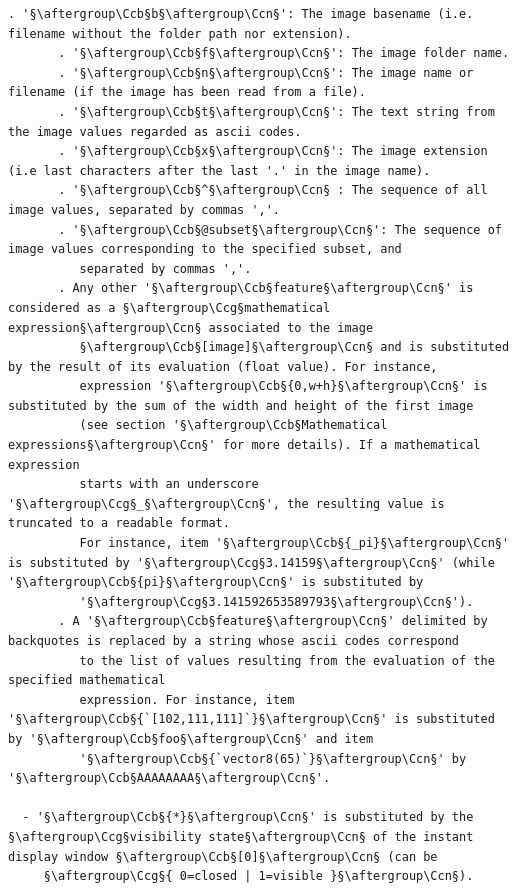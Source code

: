 \documentclass[a4paper,10.5pt,twoside]{book}
\def\Ccb{\color{cb}}
\def\Ccg{\color{cc}}
\def\Ccn{\color{black}}
\begin{document}
\begin{lstlisting}[escapechar=§]
       . '§\aftergroup\Ccb§b§\aftergroup\Ccn§': The image basename (i.e. filename without the folder path nor extension). 
       . '§\aftergroup\Ccb§f§\aftergroup\Ccn§': The image folder name. 
       . '§\aftergroup\Ccb§n§\aftergroup\Ccn§': The image name or filename (if the image has been read from a file). 
       . '§\aftergroup\Ccb§t§\aftergroup\Ccn§': The text string from the image values regarded as ascii codes. 
       . '§\aftergroup\Ccb§x§\aftergroup\Ccn§': The image extension (i.e last characters after the last '.' in the image name). 
       . '§\aftergroup\Ccb§^§\aftergroup\Ccn§ : The sequence of all image values, separated by commas ','. 
       . '§\aftergroup\Ccb§@subset§\aftergroup\Ccn§': The sequence of image values corresponding to the specified subset, and 
          separated by commas ','. 
       . Any other '§\aftergroup\Ccb§feature§\aftergroup\Ccn§' is considered as a §\aftergroup\Ccg§mathematical expression§\aftergroup\Ccn§ associated to the image 
          §\aftergroup\Ccb§[image]§\aftergroup\Ccn§ and is substituted by the result of its evaluation (float value). For instance, 
          expression '§\aftergroup\Ccb§{0,w+h}§\aftergroup\Ccn§' is substituted by the sum of the width and height of the first image 
          (see section '§\aftergroup\Ccb§Mathematical expressions§\aftergroup\Ccn§' for more details). If a mathematical expression 
          starts with an underscore '§\aftergroup\Ccg§_§\aftergroup\Ccn§', the resulting value is truncated to a readable format. 
          For instance, item '§\aftergroup\Ccb§{_pi}§\aftergroup\Ccn§' is substituted by '§\aftergroup\Ccg§3.14159§\aftergroup\Ccn§' (while '§\aftergroup\Ccb§{pi}§\aftergroup\Ccn§' is substituted by 
          '§\aftergroup\Ccg§3.141592653589793§\aftergroup\Ccn§'). 
       . A '§\aftergroup\Ccb§feature§\aftergroup\Ccn§' delimited by backquotes is replaced by a string whose ascii codes correspond 
          to the list of values resulting from the evaluation of the specified mathematical 
          expression. For instance, item '§\aftergroup\Ccb§{`[102,111,111]`}§\aftergroup\Ccn§' is substituted by '§\aftergroup\Ccb§foo§\aftergroup\Ccn§' and item 
          '§\aftergroup\Ccb§{`vector8(65)`}§\aftergroup\Ccn§' by '§\aftergroup\Ccb§AAAAAAAA§\aftergroup\Ccn§'. 
 
  - '§\aftergroup\Ccb§{*}§\aftergroup\Ccn§' is substituted by the §\aftergroup\Ccg§visibility state§\aftergroup\Ccn§ of the instant display window §\aftergroup\Ccb§[0]§\aftergroup\Ccn§ (can be 
     §\aftergroup\Ccg§{ 0=closed | 1=visible }§\aftergroup\Ccn§). 
 

\end{lstlisting}
\end{document}
